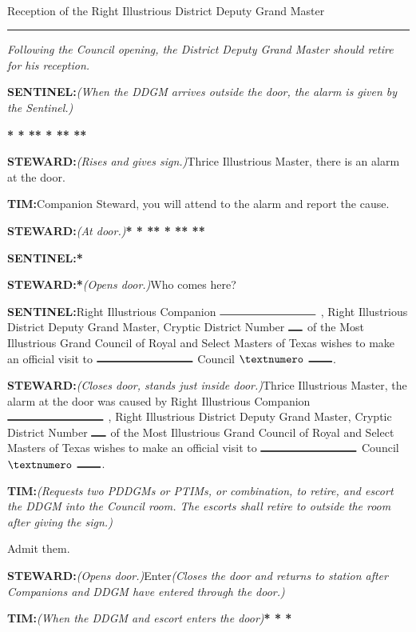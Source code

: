 \documentclass[letterpaper]{article}
\newcommand{\hexdot}{\raisebox{0.3ex}{\textbf{{\small$\pmb{\boldsymbol{\therefore}}$}}}}
\newcommand{\smallspace}{\hspace{0.5ex}}
\newcommand{\blank}[1]{$\rule{#1ex}{1pt}$}
\newcommand{\tab}{\hspace{3ex}}
\newcommand{\knock}{\textbf{* * *\tab{}* * *\tab{}* *\tab{}*}}
\newcommand{\sent}{{\color{eggplant}\textbf{SENTINEL:}}\tab{}}
\newcommand{\stew}{{\color{eggplant}\textbf{STEWARD:}}\tab{}}
\newcommand{\tim}{{\color{eggplant}\textbf{T\smallspace{}\hexdot{}\smallspace{}I\smallspace{}\hexdot{}\smallspace{}M\smallspace{}\hexdot{}\smallspace{}:}}\tab{}}
\begin{document}
		\begin{center}
			\phantom{2em}\\
			\vspace{0.5em}
			{\Large Reception of the Right Illustrious District Deputy Grand Master}
		\end{center}
	\rule{\textwidth}{1pt}
	
\emph{Following the Council opening, the District Deputy Grand Master should retire for
	his reception.}

\sent	\emph{(When the DDGM arrives outside the door, the alarm is
	given by the Sentinel.)}

\hspace{19ex}\knock{}

\stew \textit{(Rises and gives sign.)}\tab{}Thrice Illustrious Master, there is an alarm at the door.

\tim Companion Steward, you will attend to the alarm and report the cause.

\stew \emph{(At door.)}\tab{}\knock{}

\sent \textbf{*}

\stew \textbf{*}\tab{}\textit{(Opens door.)}\tab{}Who comes here?

\sent Right Illustrious Companion \blank{20} , Right Illustrious District Deputy Grand Master, Cryptic District Number \blank{3} of the Most Illustrious Grand Council of Royal and Select Masters of Texas wishes to make an official visit to \blank{20} Council $\textnumero$ \blank{5}.


\stew \textit{(Closes door, stands just inside door.)}\tab{}Thrice Illustrious Master, the alarm at the door was caused by Right Illustrious Companion \blank{20} , Right Illustrious District Deputy Grand Master, Cryptic District Number \blank{3} of the Most Illustrious Grand Council of Royal and Select Masters of Texas wishes to make an official visit to \blank{20} Council $\textnumero$ \blank{5}.

\tim \textit{(Requests two PDDGMs or PTIMs, or combination, to retire, and escort the DDGM into the Council room. The escorts shall retire to outside the room after giving the sign.)}

\tab{}\tab{}\tab{}\tab{}\hspace{2ex}\tab{}Admit them.

\stew \textit{(Opens door.)}\tab{}Enter\tab{}\textit{(Closes the door and returns to station after Companions and DDGM have entered through the door.)}

\tim \textit{(When the DDGM and escort enters the door)}\tab{}\textbf{* * *}
\end{document}
